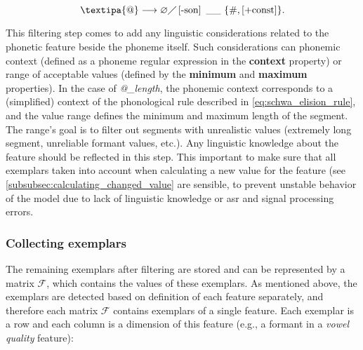 \begin{equation}
\label{eq:schwa_elision_rule}
\text{\textipa{@}}\longrightarrow \varnothing \diagup
\left[\text{-son}\right] \ \_\_ \ \{\text{\#}, \left[\text{+const}\right]\}.
\end{equation}

This filtering step comes to add any linguistic considerations related to the phonetic feature beside the phoneme itself.
Such considerations can phonemic context (defined as a phoneme regular expression in the \textbf{context} property) or range of acceptable values (defined by the \textbf{minimum} and \textbf{maximum} properties).
In the case of \textit{@\_length}, the phonemic context corresponds to a (simplified) context of the phonological rule described in \cref{eq:schwa_elision_rule}, and the value range defines the minimum and maximum length of the segment.
The range's goal is to filter out segments with unrealistic values (extremely long segment, unreliable formant values, etc.).
Any linguistic knowledge about the feature should be reflected in this step.
This important to make sure that all exemplars taken into account when calculating a new value for the feature (see \cref{subsubsec:calculating_changed_value} are sensible, to prevent unstable behavior of the model due to lack of linguistic knowledge or \ac{asr} and signal processing errors.

\subsubsection{Collecting exemplars}
\label{subsubsec:collecting_exemplars}


The remaining exemplars after filtering are stored and can be represented by a matrix $\mathcal{F}$, which contains the values of these exemplars.
As mentioned above, the exemplars are detected based on definition of each feature separately, and therefore each matrix $\mathcal{F}$ contains exemplars of a single feature.
Each exemplar is a row and each column is a dimension of this feature (e.g., a formant in a \textit{vowel quality} feature):

